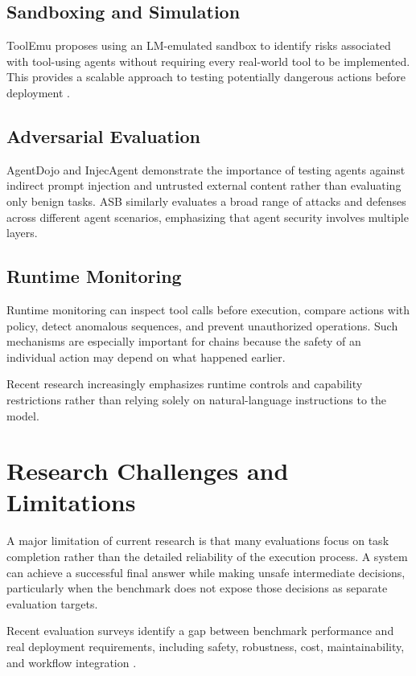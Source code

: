 \documentclass[11pt]{article}
\begin{document}
\subsection{Sandboxing and Simulation}

ToolEmu proposes using an LM-emulated sandbox to
identify risks associated with tool-using agents without
requiring every real-world tool to be implemented. This
provides a scalable approach to testing potentially
dangerous actions before deployment \cite{ruan2024toolemu}.

\subsection{Adversarial Evaluation}

AgentDojo and InjecAgent demonstrate the importance of
testing agents against indirect prompt injection and untrusted
external content rather than evaluating only benign tasks.
ASB similarly evaluates a broad range of attacks and defenses
across different agent scenarios, emphasizing that agent
security involves multiple layers.

\subsection{Runtime Monitoring}

Runtime monitoring can inspect tool calls before execution,
compare actions with policy, detect anomalous sequences,
and prevent unauthorized operations. Such mechanisms are
especially important for chains because the safety of an
individual action may depend on what happened earlier.

Recent research increasingly emphasizes runtime controls and
capability restrictions rather than relying solely on
natural-language instructions to the model.

\section{Research Challenges and Limitations}

A major limitation of current research is that many
evaluations focus on task completion rather than the detailed
reliability of the execution process. A system can achieve a
successful final answer while making unsafe intermediate
decisions, particularly when the benchmark does not expose
those decisions as separate evaluation targets.

Recent evaluation surveys identify a gap between benchmark
performance and real deployment requirements, including
safety, robustness, cost, maintainability, and workflow
integration \cite{yehudai2025survey}.
\end{document}
